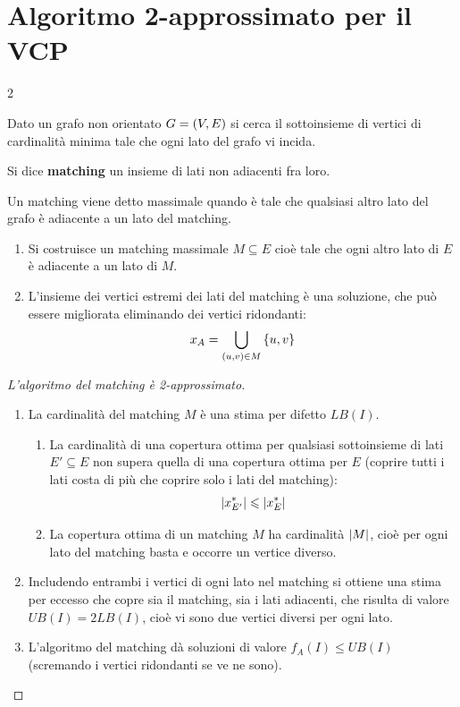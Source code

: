 \documentclass[\main/main.tex]{subfiles}
\begin{document}
\section{Algoritmo 2-approssimato per il VCP}
\begin{multicols}{2}
\begin{definition}
    Dato un grafo non orientato \(G = \left(V, E\right)\) si cerca il sottoinsieme di vertici di cardinalità minima tale che ogni lato del grafo vi incida.
\end{definition}
\begin{definition}[Matching]
Si dice \textbf{matching} un insieme di lati non adiacenti fra loro.
\end{definition}
\begin{definition}
Un matching viene detto massimale quando è tale che qualsiasi altro lato del grafo è adiacente a un lato del matching.
\end{definition}
\begin{definition}
    \begin{enumerate}
        \item Si costruisce un matching massimale \(M \subseteq E\) cioè tale che ogni altro lato di \(E\) è adiacente a un lato di \(M\).
        \item L'insieme dei vertici estremi dei lati del matching è una soluzione, che può essere migliorata eliminando dei vertici ridondanti:
        \[
            x_A = \bigcup_{\left(u,v\right) \in M} \left\{u,v\right\}
        \]
    \end{enumerate}
\end{definition}
\begin{proof}[L'algoritmo del matching è 2-approssimato]
    \begin{enumerate}
        \item La cardinalità del matching \(M\) è una stima per difetto \(LB(I)\).
        \begin{enumerate}
            \item La cardinalità di una copertura ottima per qualsiasi sottoinsieme di lati \(E' \subseteq E\) non supera quella di una copertura ottima per \(E\) (coprire tutti i lati costa di più che coprire solo i lati del matching):
            \[
                \left\lvert x^*_{E'}\right\rvert \leqslant \left\lvert x^*_E\right\rvert
            \]
            \item La copertura ottima di un matching \(M\) ha cardinalità \(\left\lvert M\right\rvert\), cioè per ogni lato del matching basta e occorre un vertice diverso.
        \end{enumerate}
        \item Includendo entrambi i vertici di ogni lato nel matching si ottiene una stima per eccesso che copre sia il matching, sia i lati adiacenti, che risulta di valore \(UB(I) = 2LB(I)\), cioè vi sono due vertici diversi per ogni lato.
        \item L'algoritmo del matching dà soluzioni di valore \(f_A(I) \leq UB(I)\) (scremando i vertici ridondanti se ve ne sono).
    \end{enumerate}
    

\end{proof}
\end{multicols}
\end{document}
